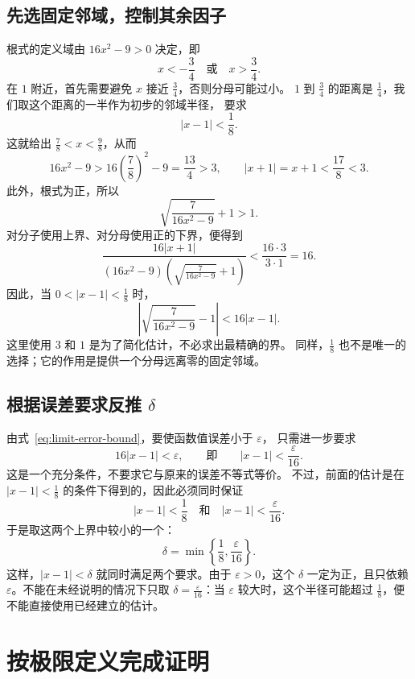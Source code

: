 \documentclass[UTF8,12pt,a4paper,fontset=fandol]{ctexart}
\begin{document}
\subsection{先选固定邻域，控制其余因子}

根式的定义域由 $16x^2-9>0$ 决定，即
\[
  x<-\frac34\quad\text{或}\quad x>\frac34.
\]
在 $1$ 附近，首先需要避免 $x$ 接近 $\frac34$，否则分母可能过小。
$1$ 到 $\frac34$ 的距离是 $\frac14$，我们取这个距离的一半作为初步的邻域半径，
要求
\[
  |x-1|<\frac18.
\]
这就给出 $\frac78<x<\frac98$，从而
\[
  16x^2-9>16\left(\frac78\right)^2-9=\frac{13}{4}>3,
  \qquad
  |x+1|=x+1<\frac{17}{8}<3.
\]
此外，根式为正，所以
\[
  \sqrt{\frac{7}{16x^2-9}}+1>1.
\]
对分子使用上界、对分母使用正的下界，便得到
\[
  \frac{16|x+1|}
       {(16x^2-9)\left(\sqrt{\frac{7}{16x^2-9}}+1\right)}
  <\frac{16\cdot3}{3\cdot1}=16.
\]
因此，当 $0<|x-1|<\frac18$ 时，
\begin{equation}\label{eq:limit-error-bound}
  \left|\sqrt{\frac{7}{16x^2-9}}-1\right|<16|x-1|.
\end{equation}
这里使用 $3$ 和 $1$ 是为了简化估计，不必求出最精确的界。
同样，$\frac18$ 也不是唯一的选择；它的作用是提供一个分母远离零的固定邻域。

\subsection{根据误差要求反推 \texorpdfstring{$\delta$}{delta}}

由式~\eqref{eq:limit-error-bound}，要使函数值误差小于 $\varepsilon$，
只需进一步要求
\[
  16|x-1|<\varepsilon,
  \qquad\text{即}\qquad
  |x-1|<\frac{\varepsilon}{16}.
\]
这是一个充分条件，不要求它与原来的误差不等式等价。
不过，前面的估计是在 $|x-1|<\frac18$ 的条件下得到的，因此必须同时保证
\[
  |x-1|<\frac18
  \quad\text{和}\quad
  |x-1|<\frac{\varepsilon}{16}.
\]
于是取这两个上界中较小的一个：
\[
  \delta=\min\left\{\frac18,\frac{\varepsilon}{16}\right\}.
\]
这样，$|x-1|<\delta$ 就同时满足两个要求。由于 $\varepsilon>0$，这个 $\delta$
一定为正，且只依赖 $\varepsilon$。不能在未经说明的情况下只取
$\delta=\frac{\varepsilon}{16}$：当 $\varepsilon$ 较大时，这个半径可能超过
$\frac18$，便不能直接使用已经建立的估计。

\section{按极限定义完成证明}
\end{document}
